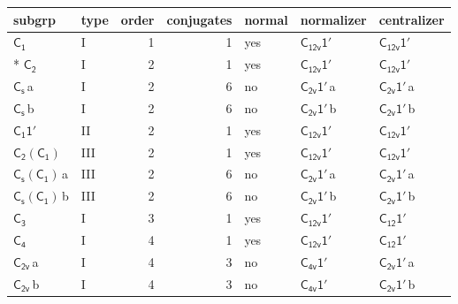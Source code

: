 \documentclass[10pt,a4paper]{article}
\numberwithin{equation}{section}
\newcommand{\grp}[1]{\mathsf{#1}}
\newcommand{\clsletter}[1]{\,{\scriptsize\color{black!55}#1}}
\begin{document}
{\small\begin{longtable}{@{}llrrlll@{}}\toprule
subgrp & type & order & conjugates & normal & normalizer & centralizer\\\midrule\endhead
\bottomrule\endfoot\endlastfoot
\href{../../../rotation/data/pdf/C1.pdf}{$\grp{C_{1}}$} & I & 1 & 1 & yes & \href{C12v-1p.pdf}{$\grp{C_{12v}1'}$} & \href{C12v-1p.pdf}{$\grp{C_{12v}1'}$}\\*
\href{../../../rotation/data/pdf/C2.pdf}{$\grp{C_{2}}$} & I & 2 & 1 & yes & \href{C12v-1p.pdf}{$\grp{C_{12v}1'}$} & \href{C12v-1p.pdf}{$\grp{C_{12v}1'}$}\\
\href{../../../rotation/data/pdf/C1v.pdf}{$\grp{C_{s}}$}\clsletter{a} & I & 2 & 6 & no & \href{C2v-1p.pdf}{$\grp{C_{2v}1'}$}\clsletter{a} & \href{C2v-1p.pdf}{$\grp{C_{2v}1'}$}\clsletter{a}\\
\href{../../../rotation/data/pdf/C1v.pdf}{$\grp{C_{s}}$}\clsletter{b} & I & 2 & 6 & no & \href{C2v-1p.pdf}{$\grp{C_{2v}1'}$}\clsletter{b} & \href{C2v-1p.pdf}{$\grp{C_{2v}1'}$}\clsletter{b}\\
\href{C1-1p.pdf}{$\grp{C_{1}1'}$} & II & 2 & 1 & yes & \href{C12v-1p.pdf}{$\grp{C_{12v}1'}$} & \href{C12v-1p.pdf}{$\grp{C_{12v}1'}$}\\
\href{C2-C1.pdf}{$\grp{C_{2}}(\grp{C_{1}})$} & III & 2 & 1 & yes & \href{C12v-1p.pdf}{$\grp{C_{12v}1'}$} & \href{C12v-1p.pdf}{$\grp{C_{12v}1'}$}\\
\href{C1v-C1.pdf}{$\grp{C_{s}}(\grp{C_{1}})$}\clsletter{a} & III & 2 & 6 & no & \href{C2v-1p.pdf}{$\grp{C_{2v}1'}$}\clsletter{a} & \href{C2v-1p.pdf}{$\grp{C_{2v}1'}$}\clsletter{a}\\
\href{C1v-C1.pdf}{$\grp{C_{s}}(\grp{C_{1}})$}\clsletter{b} & III & 2 & 6 & no & \href{C2v-1p.pdf}{$\grp{C_{2v}1'}$}\clsletter{b} & \href{C2v-1p.pdf}{$\grp{C_{2v}1'}$}\clsletter{b}\\
\href{../../../rotation/data/pdf/C3.pdf}{$\grp{C_{3}}$} & I & 3 & 1 & yes & \href{C12v-1p.pdf}{$\grp{C_{12v}1'}$} & \href{C12-1p.pdf}{$\grp{C_{12}1'}$}\\
\href{../../../rotation/data/pdf/C4.pdf}{$\grp{C_{4}}$} & I & 4 & 1 & yes & \href{C12v-1p.pdf}{$\grp{C_{12v}1'}$} & \href{C12-1p.pdf}{$\grp{C_{12}1'}$}\\
\href{../../../rotation/data/pdf/C2v.pdf}{$\grp{C_{2v}}$}\clsletter{a} & I & 4 & 3 & no & \href{C4v-1p.pdf}{$\grp{C_{4v}1'}$} & \href{C2v-1p.pdf}{$\grp{C_{2v}1'}$}\clsletter{a}\\
\href{../../../rotation/data/pdf/C2v.pdf}{$\grp{C_{2v}}$}\clsletter{b} & I & 4 & 3 & no & \href{C4v-1p.pdf}{$\grp{C_{4v}1'}$} & \href{C2v-1p.pdf}{$\grp{C_{2v}1'}$}\clsletter{b}\\

\end{longtable}}
\end{document}
